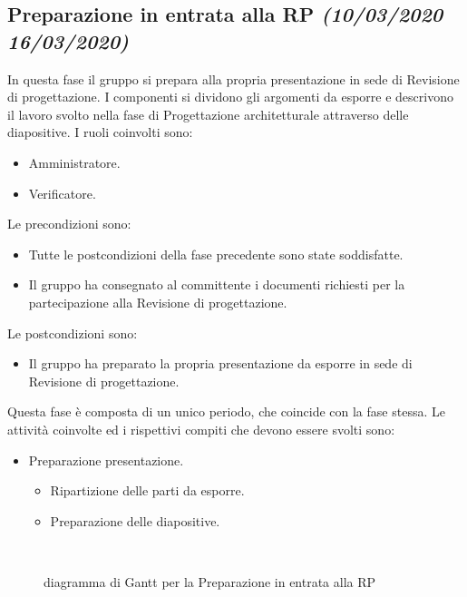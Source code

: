 \documentclass[../piano-di-progetto.tex]{subfiles}
\begin{document}
\subsection[Preparazione in entrata alla RP]{Preparazione in entrata alla RP {\normalsize\normalfont\itshape(10/03/2020  16/03/2020)}}%
\label{sub:preparazione_in_entrata_alla_rp}
In questa fase il gruppo si prepara alla propria presentazione in sede di Revisione di progettazione.
I componenti si dividono gli argomenti da esporre e descrivono il lavoro svolto nella fase di Progettazione architetturale attraverso delle diapositive.
I ruoli coinvolti sono:
\begin{itemize}
  \item Amministratore.
  \item Verificatore.
\end{itemize}
Le precondizioni sono:
\begin{itemize}
  \item Tutte le postcondizioni della fase precedente sono state soddisfatte.
  \item Il gruppo ha consegnato al committente i documenti richiesti per la partecipazione alla Revisione di progettazione.
\end{itemize}
Le postcondizioni sono:
\begin{itemize}
  \item Il gruppo ha preparato la propria presentazione da esporre in sede di Revisione di progettazione.
\end{itemize}
Questa fase è composta di un unico periodo, che coincide con la fase stessa.
Le attività coinvolte ed i rispettivi compiti che devono essere svolti sono:
\begin{itemize}
  \item Preparazione presentazione.
  \begin{itemize}
    \item Ripartizione delle parti da esporre.
    \item Preparazione delle diapositive.
  \end{itemize}
\end{itemize}
\begin{figure}[H]
  \centering
  
  \caption{diagramma di Gantt per la Preparazione in entrata alla RP}%
~~\label{fig:gantt_preparazione_rp}
\end{figure}
\end{document}
